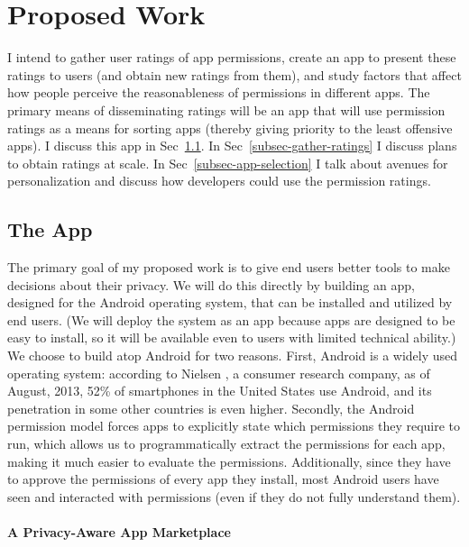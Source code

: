 \documentclass[11pt]{article}
\begin{document}
\section{Proposed Work}

I intend to gather user ratings of app permissions, create 
an app to present these ratings
to users (and obtain new ratings from them), and study factors that
affect how people perceive the reasonableness of permissions in
different apps. The primary means of disseminating ratings will be
an app that will use permission ratings as a means for sorting
apps (thereby giving priority to the least offensive apps). 
I discuss this app in Sec~\ref{subsec-the-apps}. 
In Sec~\ref{subsec-gather-ratings} 
I discuss plans to obtain ratings at scale. In
Sec~\ref{subsec-app-selection} I talk about avenues for personalization 
and discuss how developers could use the permission ratings.

\subsection{The App}
\label{subsec-the-apps}

The primary goal of my proposed work is to give end users better tools to make decisions
about their privacy. We will do this directly by building an app, designed for the Android 
operating system, that can be installed 
and utilized by end users. (We will deploy the system as an app because 
apps are designed to be easy to install, so it will be available even to users 
with limited technical ability.) We choose to build atop Android for two reasons.
First, Android is a widely used operating system: according to Nielsen 
\cite{android-market-share}, a consumer research 
company, as of August, 2013, 52\% of smartphones in the United
States use Android, and its penetration in some other countries is
even higher.
Secondly, the Android permission model forces apps to explicitly state which permissions
they require to run, which allows us to programmatically extract the permissions for each 
app, making it much easier to evaluate the permissions. Additionally, 
since they have to approve the permissions of every app they install, 
most Android users have seen and interacted with permissions (even if they 
do not fully understand them).

\paragraph{A Privacy-Aware App Marketplace}
\label{subsubsec-privacy-store}
\end{document}

